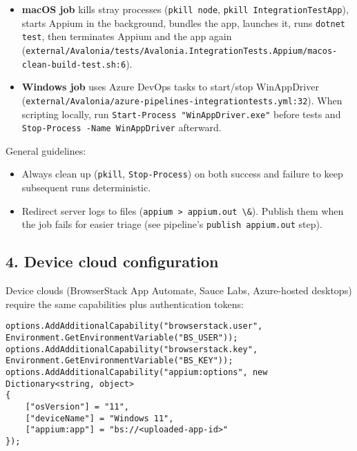 \begin{itemize}
\tightlist
\item
  \textbf{macOS job} kills stray processes
  (\passthrough{\lstinline!pkill node!},
  \passthrough{\lstinline!pkill IntegrationTestApp!}), starts Appium in
  the background, bundles the app, launches it, runs
  \passthrough{\lstinline!dotnet test!}, then terminates Appium and the
  app again
  (\passthrough{\lstinline!external/Avalonia/tests/Avalonia.IntegrationTests.Appium/macos-clean-build-test.sh:6!}).
\item
  \textbf{Windows job} uses Azure DevOps tasks to start/stop
  WinAppDriver
  (\passthrough{\lstinline!external/Avalonia/azure-pipelines-integrationtests.yml:32!}).
  When scripting locally, run
  \passthrough{\lstinline!Start-Process "WinAppDriver.exe"!} before
  tests and \passthrough{\lstinline!Stop-Process -Name WinAppDriver!}
  afterward.
\end{itemize}

General guidelines:

\begin{itemize}
\tightlist
\item
  Always clean up (\passthrough{\lstinline!pkill!},
  \passthrough{\lstinline!Stop-Process!}) on both success and failure to
  keep subsequent runs deterministic.
\item
  Redirect server logs to files
  (\passthrough{\lstinline!appium > appium.out \&!}). Publish them when
  the job fails for easier triage (see pipeline's
  \passthrough{\lstinline!publish appium.out!} step).
\end{itemize}

\subsection{4. Device cloud
configuration}\label{device-cloud-configuration}

Device clouds (BrowserStack App Automate, Sauce Labs, Azure-hosted
desktops) require the same capabilities plus authentication tokens:

\begin{lstlisting}
options.AddAdditionalCapability("browserstack.user", Environment.GetEnvironmentVariable("BS_USER"));
options.AddAdditionalCapability("browserstack.key", Environment.GetEnvironmentVariable("BS_KEY"));
options.AddAdditionalCapability("appium:options", new Dictionary<string, object>
{
    ["osVersion"] = "11",
    ["deviceName"] = "Windows 11",
    ["appium:app"] = "bs://<uploaded-app-id>"
});
\end{lstlisting}


